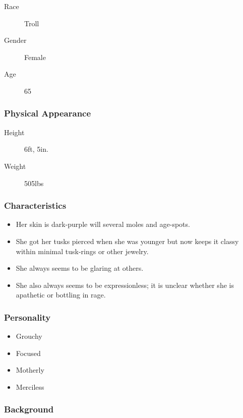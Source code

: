 \begin{description}
    \item[Race] Troll
    \item[Gender] Female
    \item[Age] 65  
\end{description}

\subsubsection{Physical Appearance}

\begin{description}
    \item[Height] 6ft, 5in.
    \item[Weight] 505lbs
\end{description}

\subsubsection{Characteristics}

\begin{itemize}
    \item Her skin is dark-purple will several moles and age-spots.
    \item She got her tusks pierced when she was younger but now keeps it classy within minimal tusk-rings or other jewelry.
    \item She always seems to be glaring at others.
    \item She also always seems to be expressionless; it is unclear whether she is apathetic or bottling in rage.
\end{itemize}

\subsubsection{Personality}

\begin{itemize}
    \item Grouchy
    \item Focused
    \item Motherly
    \item Merciless
\end{itemize}

\subsubsection{Background}

